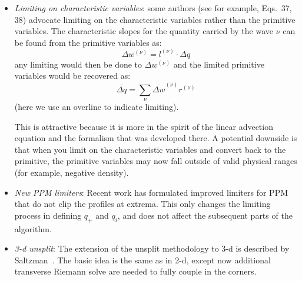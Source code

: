 \documentclass[11pt]{article}
\begin{document}
\begin{itemize}
\item {\em Limiting on characteristic variables}: some authors
  (see for example, \cite{athena} Eqs.~37, 38) advocate limiting
  on the characteristic variables rather than the primitive variables.
  The characteristic slopes for the quantity carried by the wave $\nu$
  can be found from the primitive variables as:
  \begin{equation}
  \Delta w^{(\nu)} = l^{(\nu)} \cdot \Delta q
  \end{equation}
  any limiting would then be done to $\Delta w^{(\nu)}$ and the
  limited primitive variables would be recovered as:
  \begin{equation}
  \overline{\Delta q} = \sum_\nu \overline{\Delta w}^{(\nu)} r^{(\nu)}
  \end{equation}
  (here we use an overline to indicate limiting). 

  This is attractive because it is more in the spirit of the linear
  advection equation and the formalism that was developed there.  A
  potential downside is that when you limit on the characteristic
  variables and convert back to the primitive, the primitive variables
  may now fall outside of valid physical ranges (for example, negative
  density).

\item {\em New PPM limiters}:
Recent work \cite{colellasekora} has formulated improved limiters for
PPM that do not clip the profiles at extrema.  This only changes the
limiting process in defining $q_+$ and $q_i$, and does not affect the
subsequent parts of the algorithm.


\item {\em 3-d unsplit}:
The extension of the unsplit methodology to 3-d is described by
Saltzman~\cite{saltzman:1994}.  The basic idea is the same as in 2-d,
except now additional transverse Riemann solve are needed to fully
couple in the corners.

\end{itemize}




\end{document}
